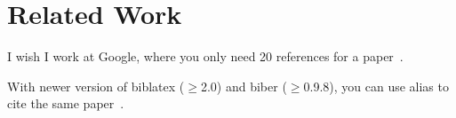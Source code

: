\section{Related Work}
\label{sec:related}

I wish I work at Google, where you only need 20 references for a paper~\cite{ghemawat03google}.

With newer version of biblatex ($\ge$2.0) and biber ($\ge$0.9.8), you can use alias to cite the same paper~\cite{gfs:sosp03}.

